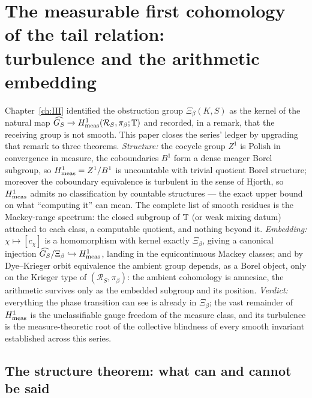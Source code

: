\chapter[Measurable cohomology of the tail relation]{The measurable first cohomology of the tail relation:\\ turbulence and the arithmetic embedding}\label{ch:XXXIX}
\renewcommand{\R}{\mathcal{R}}
\begin{summary}
Chapter~\ref{ch:III} identified the obstruction group $\Xi_\beta(K,S)$ as the kernel of the natural
map $\GS\to\Hmeas(\R_S,\pi_\beta;\T)$ and recorded, in a remark, that the receiving group
is not smooth. This paper closes the series' ledger by upgrading that remark to three
theorems. \emph{Structure:} the cocycle group $Z^1$ is Polish in convergence in measure,
the coboundaries $B^1$ form a dense meager Borel subgroup, so $H^1_{\mathrm{meas}}=Z^1/B^1$ is
uncountable with trivial quotient Borel structure; moreover the coboundary equivalence is
turbulent in the sense of Hjorth, so $H^1_{\mathrm{meas}}$ admits no classification by countable
structures --- the exact upper bound on what ``computing it'' can mean. The complete list
of smooth residues is the Mackey-range spectrum: the closed subgroup of $\mathbb{T}$ (or weak
mixing datum) attached to each class, a computable quotient, and nothing beyond it.
\emph{Embedding:} $\chi\mapsto[c_\chi]$ is a homomorphism with kernel exactly
$\Xi_\beta$, giving a canonical injection $\widehat{G_S}/\Xi_\beta\hookrightarrow H^1_{\mathrm{meas}}$, landing
in the equicontinuous Mackey classes; and by Dye--Krieger orbit equivalence the ambient
group depends, as a Borel object, only on the Krieger type of $(\R_S,\pi_\beta)$: the
ambient cohomology is amnesiac, the arithmetic survives only as the embedded subgroup
and its position. \emph{Verdict:} everything the phase transition can see is already in
$\Xi_\beta$; the vast remainder of $H^1_{\mathrm{meas}}$ is the unclassifiable gauge freedom of the
measure class, and its turbulence is the measure-theoretic root of the collective
blindness of every smooth invariant established across this series.
\end{summary}


\section{The structure theorem: what can and cannot be said}\label{XXXIX:sec:structure}

